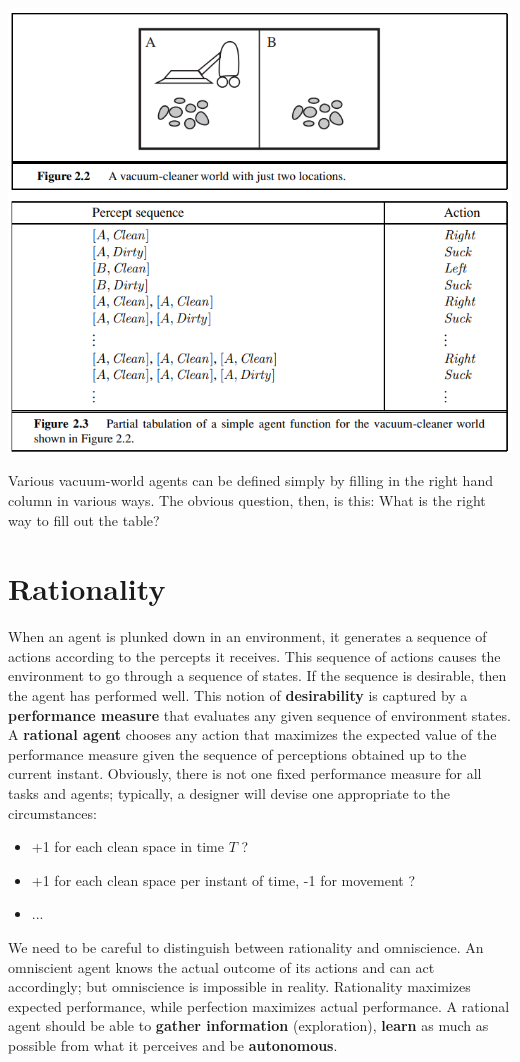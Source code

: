 \begin{center}
    \includegraphics[]{images/Vacuum agent.png}
\end{center}
Various vacuum-world agents can be defined simply by filling in the right hand column in various ways. The obvious question, then, is this: What is the right way to fill out the table? 

\section{Rationality}
When an agent is plunked down in an environment, it generates a sequence of actions according to the percepts it receives. This sequence of actions causes the environment to go through a sequence of states. If the sequence is desirable, then the agent has performed well. This notion of \textbf{desirability} is captured by a \textbf{performance measure} that evaluates any given sequence of environment states. A \textbf{rational agent} chooses any action that maximizes the expected value of the performance measure given the sequence of perceptions obtained up to the current instant.\newline\newline
Obviously, there is not one fixed performance measure for all tasks and agents; typically, a designer will devise one appropriate to the circumstances:
\begin{itemize}
    \item +1 for each clean space in time $T$ ?
    \item +1 for each clean space per instant of time, -1 for movement ?
    \item ...
\end{itemize}
We need to be careful to distinguish between rationality and omniscience. An omniscient agent knows the actual outcome of its actions and can act accordingly; but omniscience is impossible in reality. Rationality maximizes expected performance, while perfection maximizes actual performance. A rational agent should be able to \textbf{gather information} (exploration), \textbf{learn} as much as possible from what it perceives and be \textbf{autonomous}.

